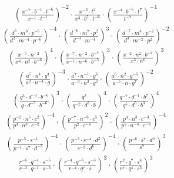 \begin{align}
\left(\frac{x^{-7}\cdot b^{-1}\cdot t^{-6}}{x^{-1}\cdot t^{-1}}\right)^{-2}\cdot \frac{x^{-3}\cdot t^{2}}{x^{3}\cdot b^{5}\cdot t^{-6}}\cdot \left(\frac{x^{-4}\cdot b^{-6}\cdot t^{7}}{t^{-7}}\right)^{-1}
\end{align}
\begin{align}
\left(\frac{d^{5}\cdot m^{3}\cdot p^{-6}}{d^{2}\cdot m^{-4}\cdot p^{-6}}\right)^{-4}\cdot \left(\frac{d^{-6}\cdot m^{7}\cdot p^{2}}{d^{-3}\cdot m^{-4}}\right)^{3}\cdot \left(\frac{d^{-7}\cdot m^{4}\cdot p^{-2}}{d^{3}\cdot m^{-2}\cdot p^{2}}\right)^{-2}
\end{align}
\begin{align}
\left(\frac{x^{-5}\cdot n^{-2}}{x^{4}\cdot n^{2}\cdot b^{-6}}\right)^{4}\cdot \left(\frac{x^{-7}\cdot n^{-2}\cdot b^{-7}}{x^{-1}\cdot n^{-6}\cdot b^{-5}}\right)^{3}\cdot \left(\frac{x^{-2}\cdot n^{2}\cdot b^{-7}}{x^{5}\cdot n^{6}}\right)^{3}
\end{align}
\begin{align}
\left(\frac{a^{5}\cdot n^{4}\cdot g^{4}}{a^{2}\cdot n^{-4}\cdot g}\right)^{-3}\cdot \frac{a^{7}\cdot n^{-1}\cdot g^{6}}{a^{-3}\cdot n^{2}\cdot g^{2}}\cdot \left(\frac{a^{6}\cdot n^{2}\cdot g^{-6}}{a^{-7}\cdot n\cdot g^{7}}\right)^{-2}
\end{align}
\begin{align}
\left(\frac{q^{3}\cdot d^{-3}\cdot b^{-6}}{q\cdot d^{-5}\cdot b^{-6}}\right)^{3}\cdot \left(\frac{q^{2}}{q^{-2}\cdot d^{2}\cdot b}\right)^{4}\cdot \left(\frac{q^{-7}\cdot d^{-1}\cdot b^{7}}{q^{5}\cdot d^{5}\cdot b^{3}}\right)^{4}
\end{align}
\begin{align}
\left(\frac{p^{-2}\cdot n^{5}\cdot c^{2}}{p^{4}\cdot n^{3}\cdot c^{-2}}\right)^{-4}\cdot \left(\frac{p^{-7}\cdot n^{-6}\cdot c^{5}}{p^{2}\cdot c^{-4}}\right)^{2}\cdot \left(\frac{p^{4}\cdot n^{3}\cdot c^{-3}}{p^{5}\cdot n^{-4}\cdot c^{-3}}\right)^{-4}
\end{align}
\begin{align}
\left(\frac{p^{-5}\cdot s^{-1}}{p^{-1}\cdot s^{7}\cdot d^{-3}}\right)^{-4}\cdot \left(\frac{p^{-3}\cdot s^{-4}\cdot d^{2}}{s^{-2}\cdot d^{6}}\right)^{-4}\cdot \left(\frac{p^{-6}\cdot s^{7}\cdot d^{6}}{s^{7}}\right)^{3}
\end{align}
\begin{align}
\frac{r^{-6}\cdot q^{-4}\cdot s^{-5}}{r^{-2}\cdot q^{-1}\cdot s^{-3}}\cdot \left(\frac{r^{-4}\cdot q^{-6}\cdot s^{-3}}{r^{-4}\cdot q^{7}\cdot s}\right)^{3}\cdot \left(\frac{r^{2}\cdot q^{7}\cdot s^{4}}{r^{7}\cdot q^{4}\cdot s^{5}}\right)^{3}
\end{align}
